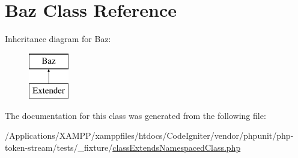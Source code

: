 \hypertarget{class_foo_1_1_bar_1_1_baz}{}\section{Baz Class Reference}
\label{class_foo_1_1_bar_1_1_baz}
Inheritance diagram for Baz\+:\begin{figure}[H]
\begin{center}
\leavevmode
\includegraphics[height=2.000000cm]{class_foo_1_1_bar_1_1_baz}
\end{center}
\end{figure}


The documentation for this class was generated from the following file\+:\begin{DoxyCompactItemize}
\item 
/\+Applications/\+X\+A\+M\+P\+P/xamppfiles/htdocs/\+Code\+Igniter/vendor/phpunit/php-\/token-\/stream/tests/\+\_\+fixture/\mbox{\hyperlink{class_extends_namespaced_class_8php}{class\+Extends\+Namespaced\+Class.\+php}}\end{DoxyCompactItemize}
